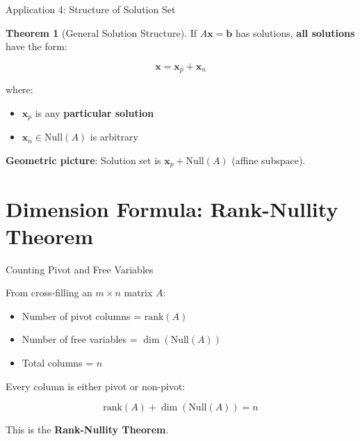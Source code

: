 \documentclass[10pt]{beamer}
\theoremstyle{definition}
\newtheorem{thm}{Theorem}[section]
\newcommand{\x}[1]{\alert{\textbf{#1}}}
\begin{document}
\begin{frame}{Application 4: Structure of Solution Set}

\begin{thm}[General Solution Structure]
If $A\mathbf{x} = \mathbf{b}$ has solutions, \textbf{all solutions} have the form:

$$\mathbf{x} = \mathbf{x}_p + \mathbf{x}_n$$

where:
\begin{itemize}
\item $\mathbf{x}_p$ is any \textbf{particular solution}
\item $\mathbf{x}_n \in \text{Null}(A)$ is arbitrary
\end{itemize}
\end{thm}

\vspace{0.5em}

\x{Geometric picture}: Solution set is $\mathbf{x}_p + \text{Null}(A)$ (affine subspace).

\end{frame}

\section{Dimension Formula: Rank-Nullity Theorem}

\begin{frame}{Counting Pivot and Free Variables}

From cross-filling an $m \times n$ matrix $A$:

\begin{itemize}
\item Number of pivot columns = $\text{rank}(A)$
\item Number of free variables = $\dim(\text{Null}(A))$
\item Total columns = $n$
\end{itemize}

\vspace{1em}

Every column is either pivot or non-pivot:

$$\text{rank}(A) + \dim(\text{Null}(A)) = n$$

\vspace{1em}

This is the \x{Rank-Nullity Theorem}.

\end{frame}
\end{document}
